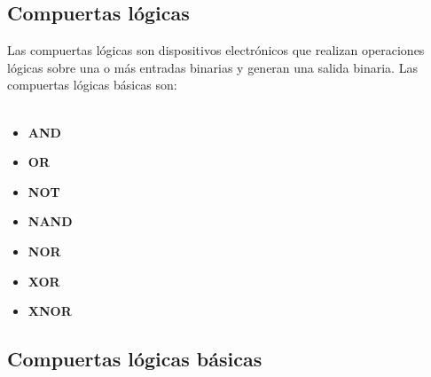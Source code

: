 \documentclass{templateNote}
\begin{document}
\subsection{Compuertas lógicas}
\noindent Las compuertas lógicas son dispositivos electrónicos que realizan operaciones lógicas sobre una o más entradas binarias y generan una salida binaria. Las compuertas lógicas básicas son: \\\\
\begin{minipage}[t]{0.5\textwidth}
    \begin{center}
    \begin{itemize}
        \item \textbf{AND} 
        \item \textbf{OR} 
        \item \textbf{NOT}
        \item \textbf{NAND}
    \end{itemize}
    \end{center}
\end{minipage}%
\begin{minipage}[t]{0.5\textwidth}
    \begin{center}
    \begin{itemize}
        \item \textbf{NOR}
        \item \textbf{XOR}
        \item \textbf{XNOR}
    \end{itemize}
    \end{center}
\end{minipage}
\subsection{Compuertas lógicas básicas}
\end{document}
